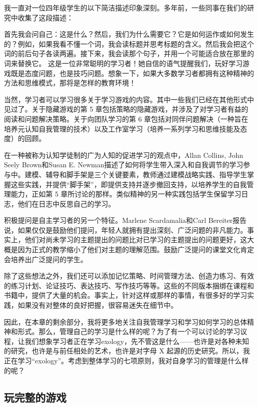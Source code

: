 我一直对一位四年级学生的以下简洁描述印象深刻。多年前，一些同事在我们的研究中收集了这段描述：

首先我会问自己：这是什么？然后，我们为什么需要它？它是如何运作或如何发生的？例如，如果我看不懂一个词，我会读标题并思考标题的含义。然后我会把这个词的前后句子各读两遍。接下来，我会读那个句子，并用一个可能适合放在那里的词来替换它。
这是一位非常聪明的学习者！她自信的语气提醒我们，玩好学习游戏既是态度问题，也是技巧问题。想象一下，如果大多数学习者都拥有这种精神的方法和思维模式，那将是怎样的教育环境！

当然，学习者可以学习很多关于学习游戏的内容。其中一些我们已经在其他形式中见过了。关于隐藏游戏的第 5 章包括策略的隐藏游戏，并涉及了对学习者有益的阅读和问题解决策略。关于向团队学习的第 6 章包括对同伴问题解决（一种旨在培养元认知自我管理的技术）以及工作室学习（培养一系列学习和思维技能及态度）的回顾。

在一种被称为认知学徒制的广为人知的促进学习的观点中，Allan Collins, John Seely Brown和Susan E. Newman描述了如何将学生带入深入和自我调节的学习参与中。建模、辅导和脚手架是三个关键要素，教师通过建模战略实践、指导学生掌握这些实践，并提供“脚手架”，即提供支持并逐步撤回支持，以培养学生的自我管理能力，正如第 5 章所讨论的那样。类似精神的另一种实践包括学生保留学习日志，他们在日志中反思自己的学习。

积极提问是自主学习者的另一个特征。Marlene Scardamalia和Carl Bereiter报告说，如果仅仅是鼓励他们提问，年轻人就拥有提出深刻、广泛问题的非凡能力。事实上，他们对尚未学习的主题提出的问题比对已学习的主题提出的问题更好，这大概是因为正式的教学缩小了他们对主题的理解范围。鼓励广泛提问的课堂文化肯定会培养出广泛提问的学生。

除了这些想法之外，我们还可以添加记忆策略、时间管理方法、创造力练习、有效的练习计划、论证技巧、表达技巧、写作技巧等等。这些的不同版本捆绑在课程和书籍中，提供了大量的机会。事实上，针对这样或那样的事情，有很多好的学习实践，如果没有对整体的良好把握，很容易迷失在细节中。

因此，在本章的剩余部分，我将更多地关注自我管理学习和学习如何学习的总体精神和形式。那么，管理自己的学习是什么样的呢？为了有一个可以讨论的学习议程，让我们想象学习者正在学习exology，先不管这是什么——也许是对各种未知的研究，也许是与前任相处的艺术，也许是对字母 X 起源的历史研究。所以，我正在学习“exology”。考虑到整体学习的七项原则，我对自身学习的管理是什么样的呢？

\subsection*{玩完整的游戏}

